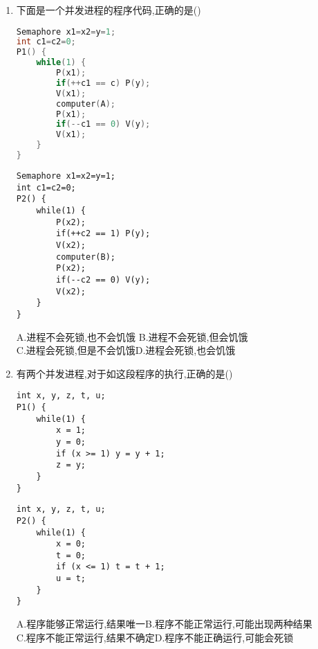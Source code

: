 \documentclass[12pt, a4paper, oneside, UTF8]{ctexbook}
\begin{document}
\begin{enumerate}
    A.a=1与a=2\qquad B. a=x与b=x\qquad C.x +=1 与 x+=2\qquad D.x+=1与x+=3
    \item 下面是一个并发进程的程序代码,正确的是() 
    \begin{center}
        \begin{minipage}[t]{0.45\textwidth}
            \begin{lstlisting}[language=C]
Semaphore x1=x2=y=1;
int c1=c2=0;
P1() {
    while(1) {
        P(x1);
        if(++c1 == c) P(y);
        V(x1);
        computer(A);
        P(x1);
        if(--c1 == 0) V(y);
        V(x1);
    }
}
                \end{lstlisting}
            \end{minipage}
            \hfil
            \begin{minipage}[t]{0.45\textwidth}
                \begin{lstlisting}
Semaphore x1=x2=y=1;
int c1=c2=0;
P2() {
    while(1) {
        P(x2);
        if(++c2 == 1) P(y);
        V(x2);
        computer(B);
        P(x2);
        if(--c2 == 0) V(y);
        V(x2);
    }
}
            \end{lstlisting}
        \end{minipage}
    \end{center}
A.进程不会死锁,也不会饥饿 \qquad B.进程不会死锁,但会饥饿 \\
C.进程会死锁,但是不会饥饿\qquad D.进程会死锁,也会饥饿 

    \item 有两个并发进程,对于如这段程序的执行,正确的是() 
\begin{center}
    \begin{minipage}[t]{0.45\textwidth}
        \begin{lstlisting}
int x, y, z, t, u;
P1() {
    while(1) {
        x = 1;
        y = 0;
        if (x >= 1) y = y + 1;
        z = y;
    }
}
    \end{lstlisting}
\end{minipage}
\hfil
\begin{minipage}[t]{0.45\textwidth}
    \begin{lstlisting}
int x, y, z, t, u;
P2() {
    while(1) {
        x = 0;
        t = 0;
        if (x <= 1) t = t + 1;
        u = t;
    }
}
            \end{lstlisting}
        \end{minipage}
    \end{center}
    A.程序能够正常运行,结果唯一\qquad B.程序不能正常运行,可能出现两种结果\\
    C.程序不能正常运行,结果不确定\qquad D.程序不能正确运行,可能会死锁



\end{enumerate}
\end{document}
